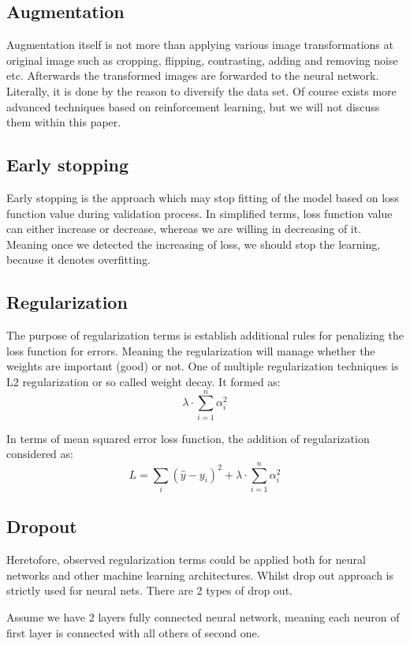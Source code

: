 \subsection{Augmentation}
Augmentation itself is not more than applying various image transformations at original image such as cropping, flipping, contrasting, adding and removing noise etc. Afterwards the transformed images are forwarded to the neural network. Literally, it is done by the reason to diversify the data set. Of course exists more advanced techniques based on reinforcement learning, but we will not discuss them within this paper.      

\subsection{Early stopping}
Early stopping is the approach which may stop fitting of the model based on loss function value during validation process. In simplified terms, loss function value can either increase or decrease, whereas we are willing in decreasing of it. Meaning once we detected the increasing of loss, we should stop the learning, because it denotes overfitting.      

\subsection{Regularization}
The purpose of regularization terms is establish additional rules for penalizing the loss function for errors. Meaning the regularization will manage whether the weights are important (good) or not. One of multiple regularization techniques is L2 regularization or so called weight decay. It formed as:
\[ \lambda \cdot \sum_{i=1}^{n} \alpha_i^2 \]

In terms of mean squared error loss function, the addition of regularization considered as:
\[ L = \sum_{i}(\hat{y}-y_i)^2 + \lambda \cdot \sum_{i=1}^{n} \alpha_i^2\]

\subsection{Dropout}
Heretofore, observed regularization terms could be applied both for neural networks and other machine learning architectures. Whilst drop out approach is strictly used for neural nets. There are 2 types of drop out. 

Assume we have 2 layers fully connected neural network, meaning each neuron of first layer is connected with all others of second one. 


